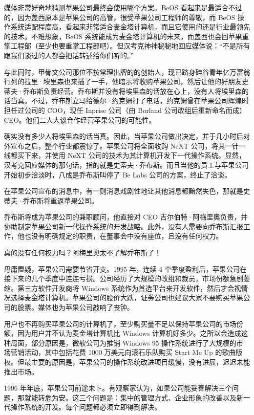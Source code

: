 \documentclass[12pt,UTF8]{ctexbook}
\begin{document}
媒体非常好奇地猜测苹果公司最终会使用哪个方案。BeOS 看起来是最适合不过的，因为盖西原本是苹果公司的高管，很受苹果公司工程师的尊敬，而 BeOS 操作系统适配程度高，看起来非常适合麦金塔计算机，而且它使用的还是行业最领先的技术。不难想象，BeOS 系统能成为麦金塔计算机的未来，而盖西也会回苹果重掌工程部（至少也要重掌工程部吧）。但汉考克神神秘秘地回应媒体说：“不是所有跟我们谈过的人都会把话转述给你们听的。”

与此同时，甲骨文公司那位不按常理出牌的的创始人，现已跻身硅谷青年亿万富翁行列的拉里·埃里森也来插了一手，他暗示将收购苹果公司，然后让他的好朋友史蒂夫·乔布斯负责经营。乔布斯并没有将埃里森的话放在心上，没有人将埃里森的话当真。不过，乔布斯立马给德尔·约克姆打了电话，约克姆曾在苹果公司辉煌时担任过公司的 COO，现任 Inprise 公司（由 Borland 公司改组后重新命名而成） CEO。他们二人大谈合作经营苹果公司的可能性。

确实没有多少人将埃里森的话当真。因此，当苹果公司做出决定，并于几小时后对外宣布之后，整个行业都震惊了。苹果公司将全面收购 NeXT 公司，将其一针一线都买下来，并使用 NeXT 公司的技术为其计算机开发下一代操作系统。显然，汉考克回应媒体的那句话，指的就是史蒂夫·乔布斯。而且当他的员工与苹果公司开始初步洽淡时，八成是乔布斯叫停了 Be Labs 公司的方案，终止了洽谈。

在苹果公司宣布的消息中，有一则消息戏剧性地让其他消息都黯然失色，那就是史蒂夫·乔布斯将重返苹果公司。

乔布斯将成为苹果公司的兼职顾问，他直接对 CEO 吉尔伯特·阿梅里奥负责，并协助制定苹果公司新一代操作系统的开发战略。此外，没有人需要向乔布斯汇报工作，他也没有明确规定的职责，在董事会中没有座位，且没有任何权力。

真的没有任何权力吗？阿梅里奥太不了解乔布斯了！

毋庸置疑，苹果公司需要节省开支。1995 年，连续 4 个季度盈利后，苹果公司在接下来的几个季度中连连亏损。公司经历了大规模的改组和裁员，市场份额急剧萎缩。第三方软件开发商将 Windows 系统作为首选平台来开发软件，然后才会视情况选择麦金塔计算机。苹果公司的股价大跌，证券公司也建议大家不要购买苹果公司的股票。媒体也为苹果公司敲响了丧钟。

用户也不再购买苹果公司的计算机了，至少购买量不足以保持苹果公司的市场份额，因为用户并不认为麦金塔计算机比 Windows 计算机好多少。之所以会造成这种局面，部分原因是，微软公司为推销 Windows 95 操作系统进行了大规模的市场营销活动，其中包括花费 1000 万美元向滚石乐队购买 Start Me Up 的歌曲版权。但最主要的原因是，苹果公司的操作系统改进项目缓慢，没有进展，迟迟未能推出市场。

1996 年年底，苹果公司前途未卜。有观察家认为，如果公司能妥善解决三个问题，那就能转危为安。这三个问题是：集中的管理方式、企业形象的改善以及新一代操作系统的开发。每个问题都必须立即得到解决。
\end{document}
